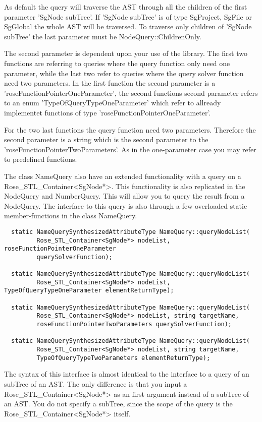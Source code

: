 {As default the query will traverse the AST through all the children of the
first parameter 'SgNode subTree'. If 'SgNode subTree' is of type SgProject, 
SgFile or SgGlobal the whole AST will be traversed. To traverse only children
of 'SgNode subTree' the last parameter must be NodeQuery::ChildrenOnly. 

The second parameter is dependent upon your use of the library. The
first two functions are referring to queries where the query function
only need one parameter, while the last two refer to queries where the 
query solver function need two parameters. In the first function the second
parameter is a 'roseFunctionPointerOneParameter', the second functions
second parameter refers to an enum 'TypeOfQueryTypeOneParameter' which 
refer to allready implementet functions of type 
'roseFunctionPointerOneParameter'. 

For the two last functions the query function need two
parameters. Therefore the second parameter is a string which is the
second parameter to the 'roseFunctionPointerTwoParameters'. As in the
one-parameter case you may refer to predefined functions.

The class NameQuery also have an extended functionality with a query
on a Rose_STL_Container<SgNode*>. This functionality is also replicated in the
NodeQuery and NumberQuery. This will allow you to query the result
from a NodeQuery. The interface to this query is also through a few
overloaded static member-functions in the class NameQuery.
\begin{verbatim}
  static NameQuerySynthesizedAttributeType NameQuery::queryNodeList(
         Rose_STL_Container<SgNode*> nodeList, roseFunctionPointerOneParameter
         querySolverFunction);

  static NameQuerySynthesizedAttributeType NameQuery::queryNodeList(
         Rose_STL_Container<SgNode*> nodeList, TypeOfQueryTypeOneParameter elementReturnType);
	  
  static NameQuerySynthesizedAttributeType NameQuery::queryNodeList(
         Rose_STL_Container<SgNode*> nodeList, string targetName, 
         roseFunctionPointerTwoParameters querySolverFunction);  

  static NameQuerySynthesizedAttributeType NameQuery::queryNodeList(
         Rose_STL_Container<SgNode*> nodeList, string targetName, 
         TypeOfQueryTypeTwoParameters elementReturnType);
\end{verbatim}
The syntax of this interface is almost identical to the interface to a query
of an subTree of an AST.  The only difference is that you input a
Rose_STL_Container<SgNode*> as an first argument instead of a subTree of an AST. You
do not specify a subTree, since the scope of the query is the Rose_STL_Container<SgNode*> itself.  
 


}
